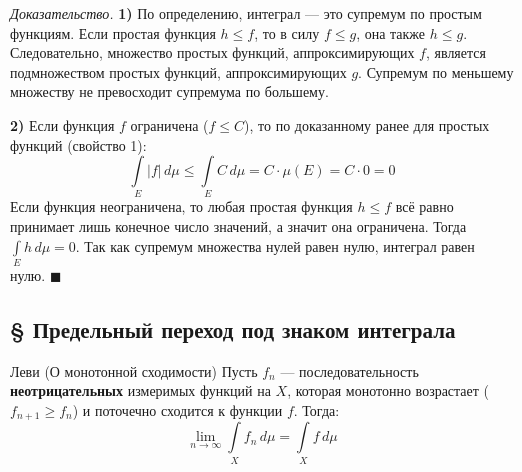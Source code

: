 \documentclass[12pt,a4paper]{article}
\newenvironment{Proof}[1][Доказательство]{\vspace{0.5em}\noindent\textit{#1.}\hspace{0.5em}\ignorespaces}{\hfill$\blacksquare$\vspace{1em}}
\begin{document}
\begin{Proof}
\textbf{1)} По определению, интеграл — это супремум по простым функциям. Если простая функция $h \le f$, то в силу $f \le g$, она также $h \le g$. Следовательно, множество простых функций, аппроксимирующих $f$, является подмножеством простых функций, аппроксимирующих $g$. Супремум по меньшему множеству не превосходит супремума по большему.

\textbf{2)} Если функция $f$ ограничена ($f \le C$), то по доказанному ранее для простых функций (свойство 1):
$$ \int\limits_E |f| \, d\mu \le \int\limits_E C \, d\mu = C \cdot \mu(E) = C \cdot 0 = 0 $$
Если функция неограничена, то любая простая функция $h \le f$ всё равно принимает лишь конечное число значений, а значит она ограничена. Тогда $\int\limits_E h \, d\mu = 0$. Так как супремум множества нулей равен нулю, интеграл равен нулю.
\end{Proof}

\subsection{§ Предельный переход под знаком интеграла}

\begin{Theorem}{Леви (О монотонной сходимости)}{}
Пусть $f_n$ — последовательность \textbf{неотрицательных} измеримых функций на $X$, которая монотонно возрастает ($f_{n+1} \ge f_n$) и поточечно сходится к функции $f$. 
Тогда:
$$ \lim\limits_{n \to \infty} \int\limits_X f_n \, d\mu = \int\limits_X f \, d\mu $$
\end{Theorem}
\end{document}
